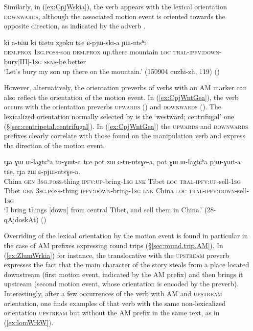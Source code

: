 Similarly, in (\ref{ex:CpjWskia}), the verb  appears with the lexical orientation \textsc{downwards}, although the associated motion event is oriented towards the opposite direction, as indicated by the adverb .

\begin{exe}
\ex \label{ex:CpjWskia}
 \gll ki a-tɕɯ ki tɕetu zgoku tɕe ɕ-pjɯ-ski-a ɲɯ-ntsʰi \\
 \textsc{dem}.\textsc{prox} \textsc{1sg}.\textsc{poss}-son \textsc{dem}.\textsc{prox} up.there mountain \textsc{loc} \textsc{tral}-\textsc{ipfv}:\textsc{down}-bury[III]-\textsc{1sg} \textsc{sens}-be.better \\
 \glt `Let's bury my son up there on the mountain.' (150904 cuzhi-zh, 119)
()
\end{exe}

However, alternatively, the orientation preverbs of verbs with an AM marker can also reflect the orientation of the motion event. In (\ref{ex:CpjWntGea}), the verb  occurs with the orientation preverbs \textsc{upwards} () and \textsc{downwards}  (). The lexicalized orientation normally selected by   is the `westward; centrifugal' one (§\ref{sec:centripetal.centrifugal}). In (\ref{ex:CpjWntGea}) the \textsc{upwards} and \textsc{downwards} prefixes clearly correlate with those found on the manipulation verb  and express the direction of the motion event.

\begin{exe}
\ex \label{ex:CpjWntGea}
\gll rɟa ɣɯ ɯ-laχtɕʰa tu-ɣɯt-a tɕe pot zɯ ɕ-tu-ntsɣe-a, pot ɣɯ ɯ-laχtɕʰa pjɯ-ɣɯt-a tɕe, rɟa zɯ ɕ-pjɯ-ntsɣe-a. \\
China \textsc{gen} \textsc{3sg}.\textsc{poss}-thing  \textsc{ipfv}:\textsc{up}-bring-\textsc{1sg} \textsc{lnk} Tibet \textsc{loc} \textsc{tral}-\textsc{ipfv}:\textsc{up}-sell-\textsc{1sg}  Tibet \textsc{gen} \textsc{3sg}.\textsc{poss}-thing  \textsc{ipfv}:\textsc{down}-bring-\textsc{1sg} \textsc{lnk} China \textsc{loc} \textsc{tral}-\textsc{ipfv}:\textsc{down}-sell-\textsc{1sg} \\
\glt `I bring things [down] from central Tibet, and sell them in China.' (28-qAjdoskAt)
()
\end{exe}

Overriding of the lexical orientation by the motion event is found in particular in the case of AM prefixes expressing round trips (§\ref{sec:round.trip.AM}). In (\ref{ex:ZlumWrkia}) for instance, the translocative  with the \textsc{upstream} preverb expresses the fact that the main character of the story steals from a place located downstream (first motion event, indicated by the AM prefix) and then brings it upstream (second motion event, whose orientation is encoded by the preverb). Interestingly, after a few occurrences of the verb  with AM and \textsc{upstream} orientation, one finds examples of that verb with the same non-lexicalized orientation \textsc{upstream} but without the AM prefix in the same text, as in (\ref{ex:lomWrkW}).

